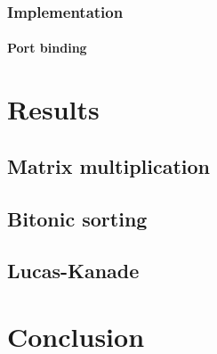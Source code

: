 \documentclass[11pt,a4paper,oneside]{memoir}
\begin{document}
\subsection{Implementation}
\subsubsection{Port binding}


\chapter{Results}
\section{Matrix multiplication}
\section{Bitonic sorting}
\section{Lucas-Kanade}

\chapter{Conclusion}

\backmatter

\printbibliography
\end{document}
